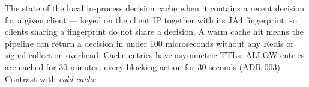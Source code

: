 \begin{description}[leftmargin=0pt, style=nextline, itemsep=8pt]
  \item[Warm cache\index{warm cache}]
  The state of the local in-process decision cache when it contains a recent
  decision for a given client — keyed on the client IP together with its JA4
  fingerprint, so clients sharing a fingerprint do not share a decision. A warm
  cache hit means the pipeline can return a decision in under 100 microseconds
  without any Redis or signal collection overhead. Cache entries have asymmetric
  TTLs: ALLOW entries are cached for 30 minutes; every blocking action for 30
  seconds (ADR-003).
  Contrast with \textit{cold cache}.

\end{description}
